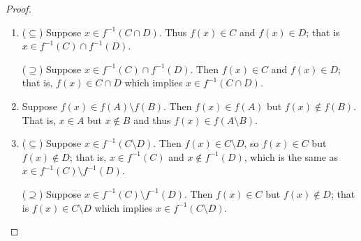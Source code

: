 \begin{proof}
\begin{enumerate}
    \item ($\subseteq$) 
    Suppose $x\in f^{-1}(C\cap D)$.
    Thus $f(x)\in C$ and $f(x)\in D$;
    that is $x\in f^{-1}(C)\cap f^{-1}(D)$.

    ($\supseteq$)
    Suppose $x\in f^{-1}(C)\cap f^{-1}(D)$.
    Then $f(x)\in C$ and $f(x)\in D$;
    that is, $f(x)\in C\cap D$ which implies $x\in f^{-1}(C\cap D)$.
    
    \item Suppose $f(x)\in f(A)\setminus f(B)$.
    Then $f(x)\in f(A)$ but $f(x)\notin f(B)$.
    That is, $x\in A$ but $x\notin B$ and thus $f(x)\in f(A\setminus B)$.
    
    \item ($\subseteq$)
    Suppose $x\in f^{-1}(C\setminus D)$.
    Then $f(x)\in C\setminus D$, so $f(x)\in C$ but $f(x)\notin D$;
    that is, $x\in f^{-1}(C)$ and $x\notin f^{-1}(D)$, which is the same as $x\in f^{-1}(C)\setminus f^{-1}(D)$.

    ($\supseteq$)
    Suppose $x\in f^{-1}(C)\setminus f^{-1}(D)$.
    Then $f(x)\in C$ but $f(x)\notin D$;
    that is $f(x)\in C\setminus D$ which implies $x\in f^{-1}(C\setminus D)$.
\end{enumerate}
\end{proof} 


